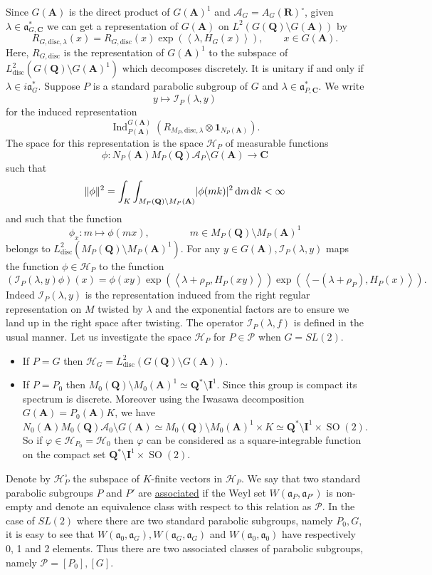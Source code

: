 \documentclass{ims9x6}
\def\A{\mathbf A}
\def\C{\mathbf C}
\def\I{\mathbf I}
\def\Q{\mathbf Q}
\def\R{\mathbf R}
\def\AAA{\mathcal A}	%
\def\HHH{\mathcal H}
\def\III{\mathcal I}
\def\PPP{\mathcal P}
\def\aaa{\mathfrak a}
\def\d{\text d}
\def\bs{\setminus}
\def\disc{\text{disc}}
\def\Ind{\operatorname{Ind}}
\def\Ltwo{L^2}
\def\mod#1{\lvert #1 \rvert} %
\def\norm#1{\Vert #1 \Vert} %
\def\sprod#1#2{\left\langle #1 , #2 \right\rangle}  %
\begin{document}
Since $G(\A)$ is the direct product of $G(\A)^1$ and $\AAA_G = A_G(\R)^\circ$, given $\lambda \in \aaa_{G, \C}^*$ we can get a representation of $G(\A)$ on $\Ltwo(G(\Q) \bs G(\A))$ by
\[ R_{G, \disc, \lambda}(x) = R_{G, \disc}(x) \exp(\sprod{\lambda}{H_G(x)}), \qquad x \in G(\A). \]
Here, $R_{G, \disc}$ is the representation of $G(\A)^1$ to the subspace of $\Ltwo_\disc(G(\Q)\bs G(\A)^1)$ which decomposes discretely. It is unitary if and only if $\lambda \in i\aaa_G^*$. Suppose $P$ is a standard parabolic subgroup of $G$ and $\lambda \in \aaa_{P, \C}^*$. We write 
\[ y \mapsto \III_P(\lambda, y) \]
for the induced representation 
\[ \Ind_{P(\A)}^{G(\A)}(R_{M_P, \disc, \lambda} \otimes \mathbf 1_{N_P(\A)}). \]
The space for this representation is the space $\HHH_P$ of measurable functions
\[ \phi : N_P(\A)M_P(\Q)\AAA_P \bs G(\A) \to \C \]
such that 
\[ \norm{\phi}^2 = \int_K \int_{M_P(\Q)\bs M_P(\A)} \mod{\phi(mk)}^2 \, \d m \, \d k < \infty \]
and such that the function
\[ \phi_x : m \mapsto \phi(mx), \qquad \qquad m \in M_P(\Q)\bs M_P(\A)^1 \]
belongs to $\Ltwo_\disc(M_P(\Q) \bs M_P(\A)^1)$.
For any $y \in G(\A), \III_P(\lambda, y)$ maps the function $\phi \in \HHH_P$ to the function
\[ (\III_P(\lambda, y)\phi)(x) = \phi(xy) \exp(\sprod{\lambda + \rho_P}{H_P(xy)}) 
		\exp(\sprod{-(\lambda + \rho_P)}{H_P(x)}). \]
Indeed $\III_P(\lambda, y)$ is the representation induced from the right regular representation on $M$ twisted by $\lambda$ and the exponential factors are to ensure we land up in the right space after twisting. The operator $\III_P(\lambda, f)$ is defined in the usual manner. Let us investigate the space $\HHH_P$ for $P \in \PPP$ when $G = SL(2)$. 
\begin{itemize}
	\item If $P=G$ then $\HHH_G = \Ltwo_{\disc}(G(\Q)\bs G(\A))$. 
	\item If $P = P_0$ then $M_0(\Q)\bs M_0(\A)^1 \simeq \Q^* \bs \I^1$. 
		Since this group is compact its spectrum is discrete. Moreover using the Iwasawa decomposition $G(\A) = P_0(\A) K$, we have
		\[ N_0(\A)M_0(\Q)\AAA_0\bs G(\A) \simeq M_0(\Q)\bs M_0(\A)^1 \times K \simeq \Q^*\bs \I^1 \times \operatorname{SO}(2). \]
		So if $\varphi \in \HHH_{P_0} = \HHH_0$ then $\varphi$ can be considered as a square-integrable function on the compact set $\Q^*\bs \I^1 \times \operatorname{SO}(2)$. 
\end{itemize}

Denote by $\HHH_P^\circ$ the subspace of $K$-finite vectors in $\HHH_P$. We say that two standard parabolic subgroups $P$ and $P'$ are \underline{associated} if the Weyl set $W(\aaa_P, \aaa_{P'})$ is non-empty and denote an equivalence class with respect to this relation as $\PPP$. In the case of $SL(2)$ where there are two standard parabolic subgroups, namely $P_0, G$, it is easy to see that $W(\aaa_0, \aaa_G), W(\aaa_G, \aaa_G)$ and $W(\aaa_0, \aaa_0)$ have respectively 0, 1 and 2 elements. Thus there are two associated classes of parabolic subgroups, namely $\PPP = [P_0], [G]$. 
\end{document}
